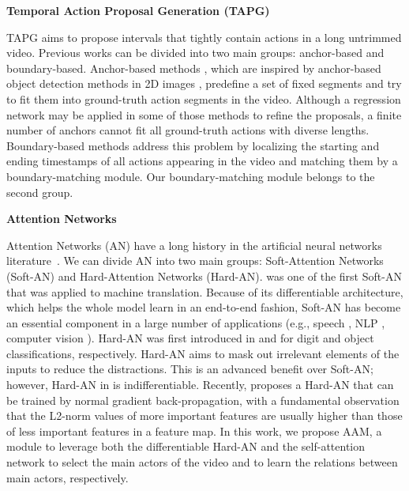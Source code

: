 \documentclass{bmvc2k}
\begin{document}
\noindent
\textbf{Temporal Action Proposal Generation (TAPG)} 

TAPG aims to propose intervals that tightly contain actions in a long untrimmed video. Previous works can be divided into two main groups: anchor-based and boundary-based. Anchor-based methods \cite{actionproposal_2016, FasterR_CNN_Action, anchor_1, anchor_2, anchor_3}, which are inspired by anchor-based object detection methods in 2D images \cite{FasterRCNN, RetinaNet, yolov3}, predefine a set of fixed segments and try to fit them into ground-truth action segments in the video. Although a regression network may be applied in some of those methods to refine the proposals, a finite number of anchors cannot fit all ground-truth actions with diverse lengths. Boundary-based methods \cite{lin2018bsn, BSN++, bmn, dbg, xu2020gtad, KhoaVo_ICASSP, KhoaVo_Access} address this problem by localizing the starting and ending timestamps of all actions appearing in the video and matching them by a boundary-matching module. Our boundary-matching module belongs to the second group.











\vspace{0.2cm}
\noindent
\textbf{Attention Networks}

Attention Networks (AN) have a long history in the artificial neural networks literature~\cite{itti1998model}. We can divide AN into two main groups: Soft-Attention Networks (Soft-AN) and Hard-Attention Networks (Hard-AN). \cite{bahdanau2014neural} was one of the first Soft-AN that was applied to machine translation. Because of its differentiable architecture, which helps the whole model learn in an end-to-end fashion, Soft-AN has become an essential component in a large number of applications (e.g., speech \cite{cho2015describing}, NLP \cite{galassi2020attention}, computer vision \cite{chaudhari2019attentive}).
Hard-AN was first introduced in \cite{xu2015show} and \cite{Saccader_NIPS2019} for digit and object classifications, respectively. Hard-AN aims to mask out irrelevant elements of the inputs to reduce the distractions. This is an advanced benefit over Soft-AN; however, Hard-AN in \cite{xu2015show} is indifferentiable. Recently, \cite{patro2018differential} proposes a Hard-AN that can be trained by normal gradient back-propagation, with a fundamental observation that the L2-norm values of more important features are usually higher than those of less important features in a feature map.
In this work, we propose AAM, a module to leverage both the differentiable Hard-AN \cite{patro2018differential} and the self-attention network \cite{attention_is_all_you_need} to select the main actors of the video and to learn the relations between main actors, respectively.
\end{document}
